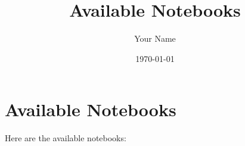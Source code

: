 \documentclass{article}
\begin{document}
\title{Available Notebooks}
\author{Your Name}
\date{\today}
\maketitle

\section{Available Notebooks}

Here are the available notebooks:

\end{document}
